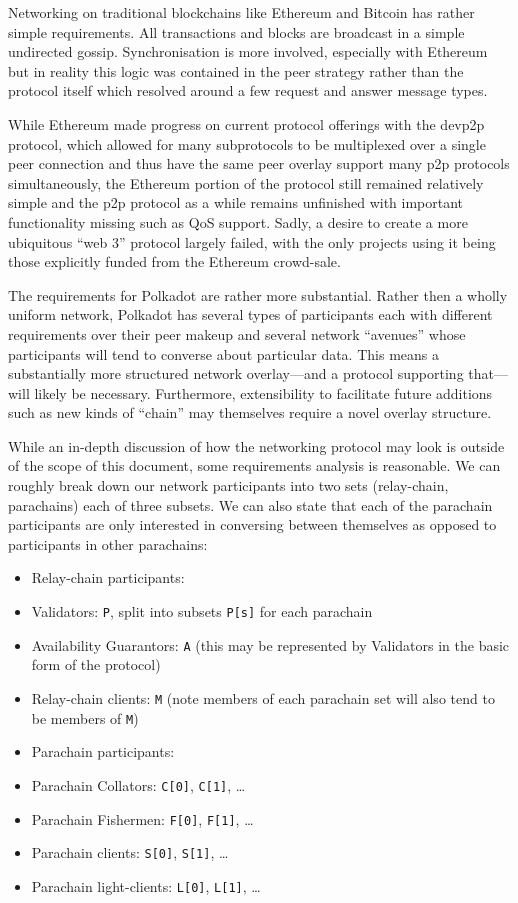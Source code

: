 \documentclass[9pt,oneside]{amsart}
\begin{document}
\begin{multicols}{2}
 Networking on traditional blockchains like Ethereum and Bitcoin has rather simple requirements. All transactions and blocks are broadcast in a simple undirected gossip. Synchronisation is more involved, especially with Ethereum but in reality this logic was contained in the peer strategy rather than the protocol itself which resolved around a few request and answer message types.

 While Ethereum made progress on current protocol offerings with the devp2p protocol, which allowed for many subprotocols to be multiplexed over a single peer connection and thus have the same peer overlay support many p2p protocols simultaneously, the Ethereum portion of the protocol still remained relatively simple and the p2p protocol as a while remains unfinished with important functionality missing such as QoS support. Sadly, a desire to create a more ubiquitous ``web 3'' protocol largely failed, with the only projects using it being those explicitly funded from the Ethereum crowd-sale.

 The requirements for Polkadot are rather more substantial. Rather then a wholly uniform network, Polkadot has several types of participants each with different requirements over their peer makeup and several network ``avenues'' whose participants will tend to converse about particular data. This means a substantially more structured network overlay---and a protocol supporting that---will likely be necessary. Furthermore, extensibility to facilitate future additions such as new kinds of ``chain'' may themselves require a novel overlay structure.

 While an in-depth discussion of how the networking protocol may look is outside of the scope of this document, some requirements analysis is reasonable. We can roughly break down our network participants into two sets (relay-chain, parachains) each of three subsets. We can also state that each of the parachain participants are only interested in conversing between themselves as opposed to participants in other parachains:

\begin{itemize}
\item Relay-chain participants:
\item Validators: \texttt{P}, split into subsets \texttt{P{[}s{]}} for each parachain
\item Availability Guarantors: \texttt{A} (this may be represented by Validators in the basic form of the protocol)
\item Relay-chain clients: \texttt{M} (note members of each parachain set will also tend to be members of \texttt{M})
\item Parachain participants:
\item Parachain Collators: \texttt{C{[}0{]}}, \texttt{C{[}1{]}}, \ldots{}
\item Parachain Fishermen: \texttt{F{[}0{]}}, \texttt{F{[}1{]}}, \ldots{}
\item Parachain clients: \texttt{S{[}0{]}}, \texttt{S{[}1{]}}, \ldots{}
\item Parachain light-clients: \texttt{L{[}0{]}}, \texttt{L{[}1{]}}, \ldots{}
\end{itemize}


\end{multicols}
\end{document}

